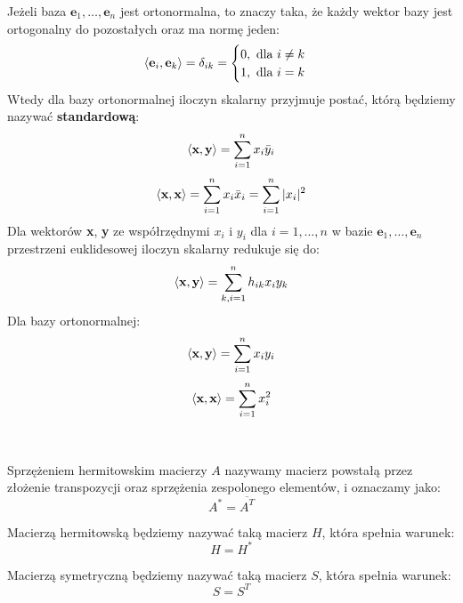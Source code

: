 Jeżeli baza $\textbf{e}_1, \ldots, \textbf{e}_n$ jest ortonormalna, to znaczy taka, że każdy wektor bazy jest ortogonalny do pozostałych oraz ma normę jeden:
\begin{equation}\label{eq:def_ortonormal_base}
    \left\langle \textbf{e}_i, \textbf{e}_k \right\rangle = \delta_{ik} = \begin{cases}
    0, \text{ dla } i \neq k \\
    1, \text{ dla } i = k
\end{cases}
\end{equation}
Wtedy dla bazy ortonormalnej iloczyn skalarny przyjmuje postać, którą będziemy nazywać \textbf{standardową}:
\begin{equation}\label{eq:std_normal_inner}
    \left\langle \textbf{x}, \textbf{y} \right\rangle = \sum_{i=1}^{n}{x_{i} \bar{y}_{i}}
\end{equation}
\begin{equation}
    \left\langle \textbf{x}, \textbf{x} \right\rangle = \sum_{i=1}^{n}{x_{i} \bar{x}_{i}} = \sum_{i=1}^{n}{|x_{i}|^2}
\end{equation}
Dla wektorów \textbf{x}, \textbf{y} ze współrzędnymi $x_i$ i $y_i$ dla $i = 1, \ldots, n$ w bazie $\textbf{e}_1, \ldots, \textbf{e}_n$
przestrzeni euklidesowej iloczyn skalarny redukuje się do:
\begin{equation}\label{eq:std_euclid_inner}
    \left\langle \textbf{x}, \textbf{y} \right\rangle = \sum_{k,i=1}^{n}{h_{ik} x_{i} {y}_{k}}
\end{equation}
Dla bazy ortonormalnej:
\begin{equation}\label{eq:std_euclid_normal_inner}
    \left\langle \textbf{x}, \textbf{y} \right\rangle = \sum_{i=1}^{n}{x_{i} {y}_{i}}
\end{equation}
\begin{equation}
    \left\langle \textbf{x}, \textbf{x} \right\rangle = \sum_{i=1}^{n}{x_{i}^2}
\end{equation}

\

\begin{definition}
    Sprzężeniem hermitowskim macierzy $A$ nazywamy macierz powstałą przez złożenie transpozycji oraz sprzężenia zespolonego elementów, i oznaczamy jako:
    $$ A^* = \overline{A^T} $$ 
\end{definition}

\begin{definition}
    Macierzą hermitowską będziemy nazywać taką macierz $H$, która spełnia warunek:
    $$H = H^*$$
\end{definition}

\begin{definition}
    Macierzą symetryczną będziemy nazywać taką macierz $S$, która spełnia warunek:
    $$S = S^T$$
\end{definition}

